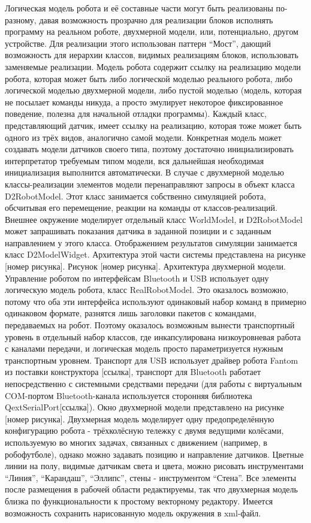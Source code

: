 	Логическая модель робота и её составные части могут быть реализованы по-разному, давая возможность прозрачно для реализации блоков исполнять программу на реальном роботе, двухмерной модели, или, потенциально, другом устройстве. Для реализации этого использован паттерн “Мост”, дающий возможность для иерархии классов, видимых реализациям блоков, использовать заменяемые реализации. Модель робота содержит ссылку на реализацию модели робота, которая может быть либо логической моделью реального робота, либо логической моделью двухмерной модели, либо пустой моделью (модель, которая не посылает команды никуда, а просто эмулирует некоторое фиксированное поведение, полезна для начальной отладки программы). Каждый класс, представляющий датчик, имеет ссылку на реализацию, которая тоже может быть одного из трёх видов, аналогично самой модели. Конкретная модель может создавать модели датчиков своего типа, поэтому достаточно инициализировать интерпретатор требуемым типом модели, вся дальнейшая необходимая инициализация выполнится автоматически.
	В случае с двухмерной моделью классы-реализации элементов модели перенаправляют запросы в объект класса D2RobotModel. Этот класс занимается собственно симуляцией робота, обсчитывая его перемещение, реакции на команды от классов-реализаций. Внешнее окружение моделирует отдельный класс WorldModel, и D2RobotModel может запрашивать показания датчика в заданной позиции и с заданным направлением у этого класса. Отображением результатов симуляции занимается класс D2ModelWidget. Архитектура этой части системы представлена на рисунке [номер рисунка].
Рисунок [номер рисунка]. Архитектура двухмерной модели.
	Управление роботом по интерфейсам Bluetooth и USB использует одну логическую модель робота, класс RealRobotModel. Это оказалось возможно, потому что оба эти интерфейса используют одинаковый набор команд в примерно одинаковом формате, разнятся лишь заголовки пакетов с командами, передаваемых на робот. Поэтому оказалось возможным вынести транспортный уровень в отдельный набор классов, где инкапсулирована низкоуровневая работа с каналами передачи, и логическая модель просто параметризуется нужным транспортным уровнем. Транспорт для USB использует драйвер робота Fantom из поставки конструктора [ссылка], транспорт для Bluetooth работает непосредственно с системными средствами передачи (для работы с виртуальным COM-портом Bluetooth-канала используется сторонняя библиотека QextSerialPort[ссылка]). 
	Окно двухмерной модели представлено на рисунке [номер рисунка]. Двухмерная модель моделирует одну предопределённую конфигурацию робота - трёхколёсную тележку с двумя ведущими колёсами, используемую во многих задачах, связанных с движением (например, в робофутболе), однако можно задавать позицию и направление датчиков. Цветные линии на полу, видимые датчикам света и цвета, можно рисовать инструментами “Линия”, “Карандаш”, “Эллипс”, стены - инструментом “Стена”. Все элементы после размещения в рабочей области редактируемы, так что двухмерная модель близка по функциональности к простому векторному редактору. Имеется возможность сохранить нарисованную модель окружения в xml-файл.
